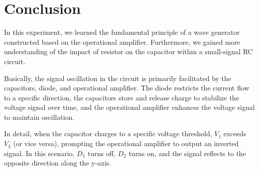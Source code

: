 \section{Conclusion}
    In this experiment, we learned the fundamental principle of a wave generator constructed based on the operational amplifier. Furthermore, we gained more understanding of the impact of resistor on the capacitor within a small-signal RC circuit.\par
    Basically, the signal oscillation in the circuit is primarily facilitated by the capacitors, diode, and operational amplifier. The diode restricts the current flow to a specific direction, the capacitors store and release charge to stabilize the voltage signal over time, and the operational amplifier enhances the voltage signal to maintain oscillation.\par
    In detail, when the capacitor charges to a specific voltage threshold, $V_1$ exceeds $V_2$ (or vice versa), prompting the operational amplifier to output an inverted signal. In this scenario, $D_1$ turns off, $D_2$ turns on, and the signal reflects to the opposite direction along the y-axis.